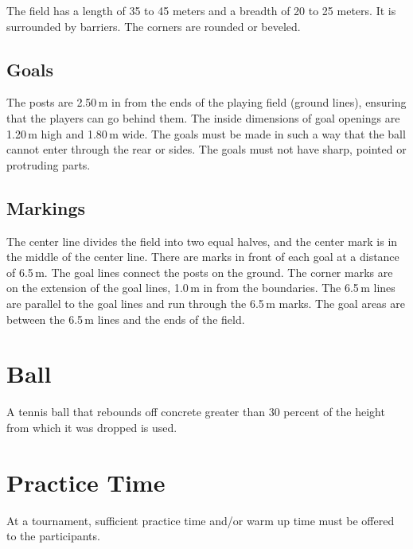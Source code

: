 

The field has a length of 35 to 45 meters and a breadth of 20 to 25 meters.
It is surrounded by barriers.
The corners are rounded or beveled.

\subsection{Goals}
The posts are 2.50\,m in from the ends of the playing field (ground lines), ensuring that the players can go behind them.
The inside dimensions of goal openings are 1.20\,m high and 1.80\,m wide.
The goals must be made in such a way that the ball cannot enter through the rear or sides.
The goals must not have sharp, pointed or protruding parts.

\subsection{Markings}
The center line divides the field into two equal halves, and the center mark is in the middle of the center line.
There are marks in front of each goal at a distance of 6.5\,m.
The goal lines connect the posts on the ground.
The corner marks are on the extension of the goal lines, 1.0\,m in from the boundaries.
The 6.5\,m lines are parallel to the goal lines and run through the 6.5\,m marks.
The goal areas are between the 6.5\,m lines and the ends of the field.

\section{Ball}
A tennis ball that rebounds off concrete greater than 30 percent of the height from which it was dropped is used.

\section{Practice Time}
At a tournament, sufficient practice time and/or warm up time must be offered to the participants.

